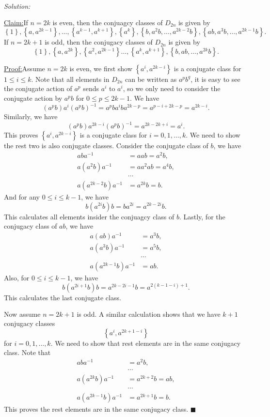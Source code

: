 \documentclass[a4paper, 12pt]{article}
\newenvironment{solution}
    {\textit{Solution:}}
    {}
\newenvironment{claim}[1]{\par\noindent\underline{Claim:}\space#1}{}
\newenvironment{claimproof}[1]{\par\noindent\underline{Proof:}\space#1}{\hfill $\blacksquare$}
\begin{document}
\begin{solution}
\begin{enumerate}[(1)]
\begin{claim}
If \(n=2k\) is even, then the conjuagcy classes of \(D_{2n}\) is given by 
\[\left\{ 1 \right\},\left\{ a,a^{2k-1} \right\},\ldots,\left\{ a^{k-1},a^{k+1} \right\},\left\{ a^k \right\},\left\{ b,a^2b,\ldots,a^{2k-2}b \right\},\left\{ ab,a^3b,\ldots,a^{2k-1}b \right\}.\]
If \(n=2k+1\) is odd, then the conjugacy classes of \(D_{2n}\) is given by 
\[\left\{ 1 \right\},\left\{ a,a^{2k} \right\},\left\{ a^2,a^{2k-1} \right\}\ldots,\left\{ a^k,a^{k+1} \right\},\left\{ b,ab,\ldots,a^{2k}b \right\}.\]
\end{claim}
\begin{claimproof}
Assume \(n=2k\) is even, we first show \(\left\{ a^i,a^{2k-i} \right\}\) is a conjugate class for \(1\leq i\leq k\). Note that all elements in \(D_{2n}\) can be written as \(a^pb^q\), it is easy to see the conjugate action of \(a^p\) sends \(a^i\) to \(a^i\), so we only need to consider the conjugate action by \(a^p b\) for \(0\leq p\leq 2k-1\). We have 
\[(a^p b) a^i (a^pb)^{-1}=a^pba^iba^{2k-p}=a^{p-i+2k-p}=a^{2k-i}.\]
Similarly, we have 
\[(a^pb)a^{2k-i}(a^pb)^{-1}=a^{2k-2k+i}=a^i.\] 
This proves \(\left\{ a^i,a^{2k-i} \right\}\) is a conjugate class for \(i=0,1,\ldots,k\). We need to show the rest two is also conjugate classes. Consider the conjugate class of \(b\), we have 
\begin{align*}
	aba^{-1}&=aab=a^2b,\\ 
	a(a^2b)a^{-1}&=aa^2ab=a^4b,\\ 
	&\cdots\\ 
	a(a^{2k-2}b)a^{-1}&=a^{2k}b=b.
\end{align*}
And for any \(0\leq i\leq k-1\), we have 
\[b(a^{2i}b)b=ba^{2i}=a^{2k-2i}b.\]
This calculates all elements insider the conjuagcy class of \(b\). Lastly, for the conjugacy class of \(ab\), we have 
\begin{align*}
	a(ab)a^{-1}&=a^3b,\\ 
	a(a^3b)a^{-1}&=a^5b,\\ 
	&\cdots\\ 
	a(a^{2k-1}b)a^{-1}&=ab.
\end{align*}
Also, for \(0\leq i\leq k-1\), we have 
\[b(a^{2i+1}b)b=a^{2k-2i-1}b=a^{2(k-1-i)+1}.\]
This calculates the last conjugate class. 

Now assume \(n=2k+1\) is odd. A similar calculation shows that we have \(k+1\) conjugacy classes 
\[\left\{ a^i,a^{2k+1-i} \right\}\]
for \(i=0,1,\ldots,k\). We need to show that rest elements are in the same conjugacy class. Note that 
\begin{align*}
	aba^{-1}&=a^2b,\\ 
	&\cdots\\ 
	a(a^{2k}b)a^{-1}&=a^{2k+2}b=ab,\\ 
	&\cdots\\ 
	a(a^{2k-1}b)a^{-1}&=a^{2k+1}b=b.
\end{align*}
This proves the rest elements are in the same conjugacy class.
\end{claimproof}


\end{enumerate}
\end{solution}
\end{document}
